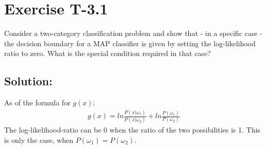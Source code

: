 \section*{Exercise T-3.1}
Consider a two-category classification problem and show that - in a
specific case - the decision boundary for a MAP classifier is given by setting the log-likelihood ratio to zero. What is the special condition required in that case?

\subsection*{Solution:}
As of the formula for $g(x)$:
\begin{align}
	g(x)=ln\frac{P(x|\omega_1)}{P(x|\omega_2)}+ln\frac{P(\omega_1)}{P(\omega_2)}
\end{align}
The log-likelihood-ratio can be 0 when the ratio of the two possibilities is 1. This is only the case, when $P(\omega_1)=P(\omega_2)$.